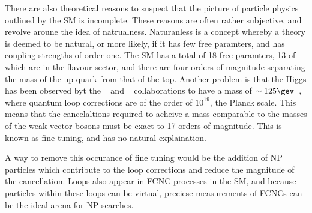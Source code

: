 There are also theoretical reasons to suspect that the picture of particle physics outlined by the
SM is incomplete.
These reasons are often rather subjective, and revolve aroune the idea of natrualness.
Naturanless is a concept whereby a theory is deemed to be natural, or more likely, if it has few
free paramters, and has coupling strengths of order one.
The SM has a total of 18 free paramters, 13 of which are in the flavour sector, and there are four
orders of magnitude separating the mass of the up quark from that of the top.
Another problem is that the Higgs has been observed byt the
\atlas~\cite{Aad:2008zzm} and
\cms~\cite{Chatrchyan:2008aa}
collaborations to have a mass of $\sim125\gev$~\cite{Chatrchyan:2012ufa,Aad:2012tfa}, where quantum
loop corrections are of the order of $10^{19}$, the Planck scale.
This means that the cancelaltions required to acheive a mass comparable to the masses of the weak
vector bosons must be exact to 17 orders of magnitude.
This is known as fine tuning, and has no natural explaination.

A way to remove this occurance of fine tuning would be the addition of NP particles which
contribute to the loop corrections and reduce the magnitude of the cancellation.
Loops also appear in FCNC processes in the SM, and because particles within these loops can be
virtual, preciese measurements of FCNCs can be the ideal arena for NP searches.


